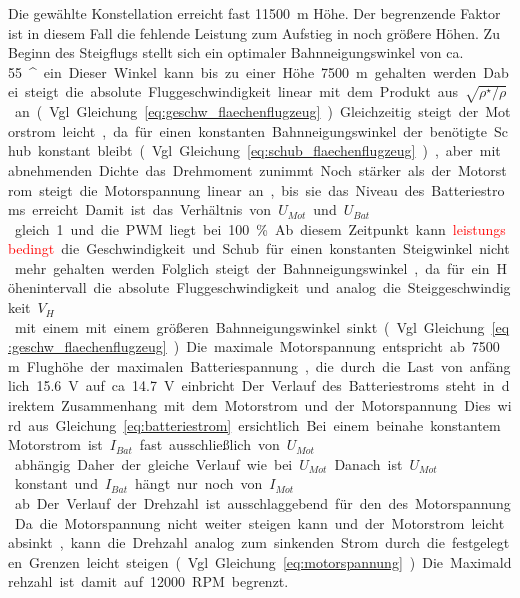 Die gewählte Konstellation erreicht fast \SI{11500}{m} Höhe. Der begrenzende Faktor ist in diesem Fall die fehlende Leistung zum Aufstieg in noch größere Höhen. Zu Beginn des Steigflugs stellt sich ein optimaler Bahnneigungswinkel von ca. \SI{55}{^\circ} ein. Dieser Winkel kann bis zu einer Höhe \SI{7500}{m} gehalten werden. Dabei steigt die absolute Fluggeschwindigkeit linear mit dem Produkt aus \ensuremath{\sqrt{\rho^\star/\rho}} an (Vgl. Gleichung \ref{eq:geschw_flaechenflugzeug}). Gleichzeitig steigt der Motorstrom leicht, da für einen konstanten Bahnneigungswinkel der benötigte Schub konstant bleibt (Vgl. Gleichung \ref{eq:schub_flaechenflugzeug}), aber mit abnehmenden Dichte das Drehmoment zunimmt. Noch stärker als der Motorstrom steigt die Motorspannung linear an, bis sie das Niveau des Batteriestroms erreicht. Damit ist das Verhältnis von \ensuremath{U_{Mot}} und \ensuremath{U_{Bat}} gleich 1 und  die PWM liegt bei \SI{100}{\%}. Ab diesem Zeitpunkt kann \textcolor{red}{leistungsbedingt} die Geschwindigkeit und Schub für einen konstanten Steigwinkel nicht mehr gehalten werden. Folglich steigt der Bahnneigungswinkel, da für ein Höhenintervall die absolute Fluggeschwindigkeit und analog die Steiggeschwindigkeit \ensuremath{V_H} mit einem mit einem  größeren Bahnneigungswinkel sinkt (Vgl. Gleichung \ref{eq:geschw_flaechenflugzeug}). Die maximale Motorspannung entspricht ab \SI{7500}{m} Flughöhe der maximalen Batteriespannung, die durch die Last von anfänglich \SI{15,6}{V} auf ca. \SI{14.7}{V} einbricht. Der Verlauf des Batteriestroms steht in direktem Zusammenhang mit dem Motorstrom und der Motorspannung. Dies wird aus Gleichung \ref{eq:batteriestrom} ersichtlich. Bei einem beinahe konstantem Motorstrom ist \ensuremath{I_{Bat}} fast ausschließlich von \ensuremath{U_{Mot}} abhängig. Daher der gleiche Verlauf wie bei \ensuremath{U_{Mot}}. Danach ist \ensuremath{U_{Mot}} konstant und \ensuremath{I_{Bat}} hängt nur noch von \ensuremath{I_{Mot}} ab. 
Der Verlauf der Drehzahl ist ausschlaggebend für den des Motorspannung. Da die Motorspannung nicht weiter steigen kann und der Motorstrom leicht absinkt, kann die Drehzahl analog zum sinkenden Strom durch die festgelegten Grenzen leicht steigen (Vgl. Gleichung \ref{eq:motorspannung}). Die Maximaldrehzahl ist damit auf \SI{12000}{RPM} begrenzt. 


